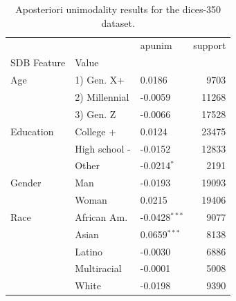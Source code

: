 \begin{table}[ht]\centering
\caption{Aposteriori unimodality results for the dices-350 dataset.}
\label{tab:dices-350}
\begin{tabular}{lllr}
\toprule
 &  & apunim & support \\
SDB Feature & Value &  &  \\
\midrule
Age & 1) Gen. X+ & 0.0186 & 9703 \\
 & 2) Millennial & -0.0059 & 11268 \\
 & 3) Gen. Z & -0.0066 & 17528 \\
Education & College + & 0.0124 & 23475 \\
 & High school - & -0.0152 & 12833 \\
 & Other & -0.0214$^{*}$ & 2191 \\
Gender & Man & -0.0193 & 19093 \\
 & Woman & 0.0215 & 19406 \\
Race & African Am. & -0.0428$^{***}$ & 9077 \\
 & Asian & 0.0659$^{***}$ & 8138 \\
 & Latino & -0.0030 & 6886 \\
 & Multiracial & -0.0001 & 5008 \\
 & White & -0.0198 & 9390 \\
\bottomrule
\end{tabular}
\end{table}
